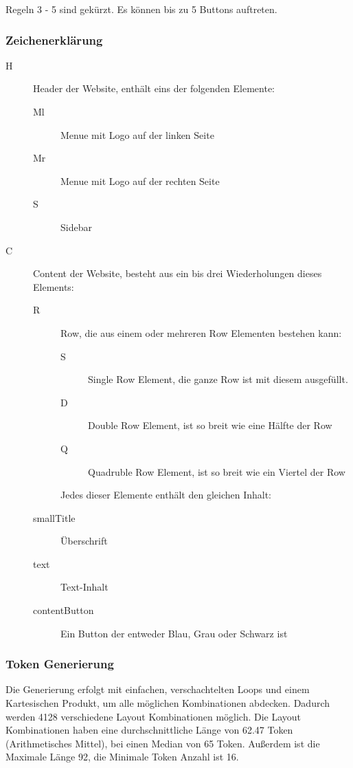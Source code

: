 \documentclass[pdftex,a4paper,halfparskip]{scrartcl}
\begin{document}
Regeln 3 - 5 sind gekürzt. Es können bis zu 5 Buttons auftreten.

\subsubsection{Zeichenerklärung}

\begin{description}
	\item[H] Header der Website, enthält eins der folgenden Elemente: 
	\begin{description}
		\item[Ml] Menue mit Logo auf der linken Seite
		\item[Mr] Menue mit Logo auf der rechten Seite
		\item[S] Sidebar	
	\end{description}
	\item[C] Content der Website, besteht aus ein bis drei Wiederholungen dieses Elements:
	\begin{description}
		\item[R] Row, die aus einem oder mehreren Row Elementen bestehen kann:
		\begin{description}
			\item[S] Single Row Element, die ganze Row ist mit diesem ausgefüllt.
			\item[D] Double Row Element, ist so breit wie eine Hälfte der Row
			\item[Q] Quadruble Row Element, ist so breit wie ein Viertel der Row
		\end{description}
		Jedes dieser Elemente enthält den gleichen Inhalt:
		\item[smallTitle] Überschrift
		\item[text] Text-Inhalt
		\item[contentButton] Ein Button der entweder Blau, Grau oder Schwarz ist 
	\end{description}
\end{description}

\subsubsection{Token Generierung}

Die Generierung erfolgt mit einfachen, verschachtelten Loops und einem Kartesischen Produkt, um alle möglichen Kombinationen abdecken. Dadurch werden 4128 verschiedene Layout Kombinationen möglich. 
Die Layout Kombinationen haben eine durchschnittliche Länge von 62.47 Token (Arithmetisches Mittel), bei einen Median von 65 Token. Außerdem ist die Maximale Länge 92, die Minimale Token Anzahl ist 16.
\end{document}
